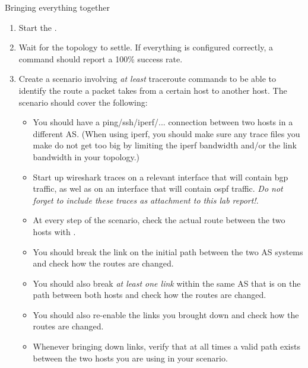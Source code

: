\begin{exercise}{Bringing everything together}
	\begin{enumerate}
		\item Start the .
		\item Wait for the topology to settle. If everything is configured correctly, a  command should report a 100\% success rate.
		\item Create a scenario involving \emph{at least} traceroute commands to be able to identify the route a packet takes from a certain host to another host. The scenario should cover the following:
		\begin{itemize}
			\item You should have a ping/ssh/iperf/... connection between two hosts in a different AS. (When using iperf, you should make sure any trace files you make do  not get too big by limiting the iperf bandwidth and/or the link bandwidth in your topology.)
			\item Start up wireshark traces on a relevant interface that will contain \acs{bgp} traffic, as wel as on an interface that will contain \acs{ospf} traffic. \emph{Do not forget to include these traces as attachment to this lab report!}.
			\item At every step of the scenario, check the actual route between the two hosts with .
			\item You should break the link on the initial path between the two AS systems and check how the routes are changed.
			\item You should also break \emph{at least one link} within the same AS that is on the path between both hosts and check how the routes are changed.
			\item You should also re-enable the links you brought down and check how the routes are changed.
			\item Whenever bringing down links, verify that at all times a valid path exists between the two hosts you are using in your scenario.
		\end{itemize}


\end{enumerate}
\end{exercise}
